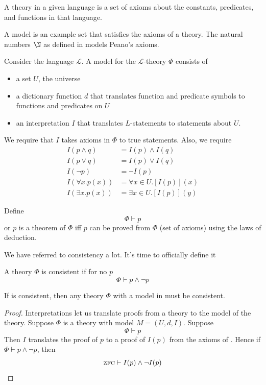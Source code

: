 \documentclass{scrbook}
\renewcommand{\implies}{\to}
\begin{document}
\begin{defn}[theory]
  A theory in a given language is a set of axioms about the constants, predicates, and functions in that language.   
\end{defn}
A model is an example set that satisfies the axioms of a theory. The natural numbers $\N$ as defined in \zfc models Peano's axioms.
\begin{defn}[model]
  Consider the language $\mathcal L$. A model for the $\mathcal L$-theory $\Phi$  consists of
  \begin{itemize}
  \item a set $U$, the universe
  \item a dictionary function $d$ that
    translates function and predicate symbols to functions and
    predicates on $U$
  \item an interpretation $I$ that translates
    $L$-statements to statements about $U$. 
  \end{itemize}
  We require that $I$ takes axioms in $\Phi$ to true statements. Also, we require
  \begin{align*}
  I(p\wedge q)&=I(p)\wedge I(q) \\
  I(p\vee q) &= I(p)\vee I(q) \\
  I(\neg p) &= \neg I(p) \\
  I(\forall x . p(x)) &= \forall x \in U. [I(p)](x) \\
    I(\exists x. p(x))&= \exists x \in U . [I(p)](y)
  \end{align*}
\end{defn}
\begin{defn}
  Define \[\Phi\vdash p\] or $p$ is a theorem of $\Phi$ iff $p$ can be proved from $\Phi$ (set of axioms) using the laws of deduction.
\end{defn}
We have referred to consistency a lot. It's time to officially define it
\begin{defn}[consistency]
  A theory $\Phi$ is consistent if for no $p$
  \[
  \Phi\vdash p\wedge\neg p 
  \]
\end{defn}
\begin{theorem}[model \implies\ consistent]
  If \zfc is consistent, then any theory $\Phi$ with a model in \zfc must be consistent. 
\end{theorem}
\begin{proof}
  Interpretations let us translate proofs from a theory to the model of the theory. 
  Suppose $\Phi$ is a theory with model $M=(U,d,I)$. Suppose
  \[
  \Phi\vdash p
  \]
  Then $I$ translates the proof of $p$ to a proof of $I(p)$ from the axioms of \zfc. Hence if $\Phi \vdash p\wedge \neg p$, then \[\textsc{zfc} \vdash I(p)\wedge \neg I(p)\]
\end{proof}
\end{document}
